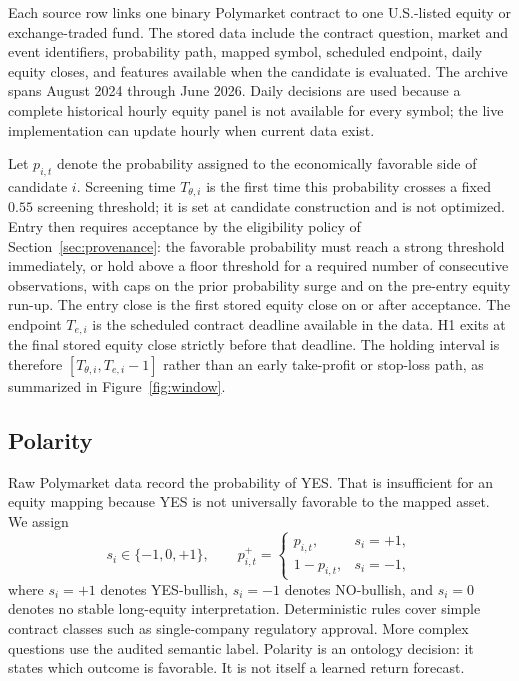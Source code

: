 \documentclass[sigconf,anonymous]{acmart}
\begin{document}
Each source row links one binary Polymarket contract to one U.S.-listed equity or exchange-traded fund. The stored data include the contract question, market and event identifiers, probability path, mapped symbol, scheduled endpoint, daily equity closes, and features available when the candidate is evaluated. The archive spans August 2024 through June 2026. Daily decisions are used because a complete historical hourly equity panel is not available for every symbol; the live implementation can update hourly when current data exist.

Let $p_{i,t}$ denote the probability assigned to the economically favorable side of candidate $i$. Screening time $T_{\theta,i}$ is the first time this probability crosses a fixed $0.55$ screening threshold; it is set at candidate construction and is not optimized. Entry then requires acceptance by the eligibility policy of Section~\ref{sec:provenance}: the favorable probability must reach a strong threshold immediately, or hold above a floor threshold for a required number of consecutive observations, with caps on the prior probability surge and on the pre-entry equity run-up. The entry close is the first stored equity close on or after acceptance. The endpoint $T_{e,i}$ is the scheduled contract deadline available in the data. H1 exits at the final stored equity close strictly before that deadline. The holding interval is therefore $[T_{\theta,i},T_{e,i}-1]$ rather than an early take-profit or stop-loss path, as summarized in Figure~\ref{fig:window}.

\subsection{Polarity}

Raw Polymarket data record the probability of YES. That is insufficient for an equity mapping because YES is not universally favorable to the mapped asset. We assign
\[
s_i \in \{-1,0,+1\}, \qquad
p_{i,t}^{+} =
\begin{cases}
p_{i,t}, & s_i=+1,\\
1-p_{i,t}, & s_i=-1,
\end{cases}
\]
where $s_i=+1$ denotes YES-bullish, $s_i=-1$ denotes NO-bullish, and $s_i=0$ denotes no stable long-equity interpretation. Deterministic rules cover simple contract classes such as single-company regulatory approval. More complex questions use the audited semantic label. Polarity is an ontology decision: it states which outcome is favorable. It is not itself a learned return forecast.
\end{document}
